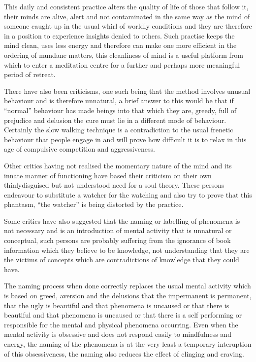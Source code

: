 \documentclass[a5paper,10pt,english]{book}
\begin{document}
\sphinxAtStartPar
This daily and consistent practice alters the quality of life of those that follow it, their minds are alive, alert and not contaminated in the same way as the mind of someone caught up in the usual whirl of worldly conditions and they are therefore in a position to experience insights denied to others. Such practise keeps the mind clean, uses less energy and therefore can make one more efficient in the ordering of mundane matters, this cleanliness of mind is a useful platform from which to enter a meditation centre for a further and perhaps more meaningful period of retreat.

\sphinxAtStartPar
There have also been criticisms, one such being that the method involves unusual behaviour and is therefore unnatural, a brief answer to this would be that if “normal” behaviour has made beings into that which they are, greedy, full of prejudice and delusion the cure must lie in a different mode of behaviour. Certainly the slow walking technique is a contradiction to the usual frenetic behaviour that people engage in and will prove how difficult it is to relax in this age of compulsive competition and aggressiveness.

\sphinxAtStartPar
Other critics having not realised the momentary nature of the mind and its innate manner of functioning have based their criticism on their own thinly\sphinxhyphen{}disguised but not understood need for a soul theory. These persons endeavour to substitute a watcher for the watching and also try to prove that this phantasm, “the watcher” is being distorted by the practice.

\sphinxAtStartPar
Some critics have also suggested that the naming or labelling of phenomena is not necessary and is an introduction of mental activity that is unnatural or conceptual, such persons are probably suffering from the ignorance of book information which they believe to be knowledge, not understanding that they are the victims of concepts which are contradictions of knowledge that they could have.

\sphinxAtStartPar
The naming process when done correctly replaces the usual mental activity which is based on greed, aversion and the delusions that the impermanent is permanent, that the ugly is beautiful and that phenomena is uncaused or that there is beautiful and that phenomena is uncaused or that there is a self performing or responsible for the mental and physical phenomena occurring. Even when the mental activity is obsessive and does not respond easily to mindfulness and energy, the naming of the phenomena is at the very least a temporary interuption of this obsessiveness, the naming also reduces the effect of clinging and craving.
\end{document}
